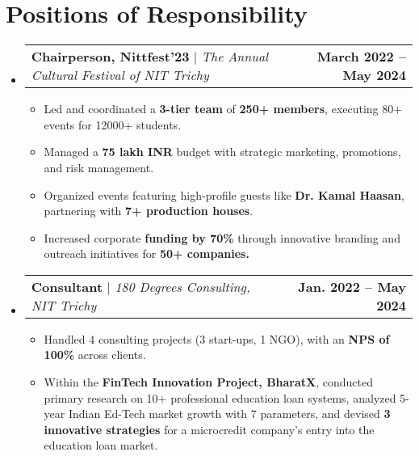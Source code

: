 \documentclass[letterpaper,11pt]{article}
\makeatletter
\newcommand{\resumeProjectHeading}[2]{
    \item
    \begin{tabular*}{0.97\textwidth}{l@{\extracolsep{\fill}}r}
      \small#1 & \textbf{{\small#2}} \\
    \end{tabular*}\vspace{-7pt}
}
\newcommand{\resumeItem}[1]{
  \item\small{
    {#1 \vspace{-2pt}}
  }
}
\newcommand{\resumeSubHeadingListStart}{\begin{itemize}[leftmargin=0.15in, label={}]}
\newcommand{\resumeSubHeadingListEnd}{\end{itemize}}
\newcommand{\resumeItemListStart}{\begin{itemize}}
\newcommand{\resumeItemListEnd}{\end{itemize}\vspace{-5pt}}
\makeatother
\begin{document}
\section{Positions of Responsibility}
    \resumeSubHeadingListStart
      \resumeProjectHeading
          {\textbf{Chairperson, Nittfest’23} $|$ \emph{The Annual Cultural Festival of NIT Trichy}}{March 2022 -- May 2024}
          \resumeItemListStart
            \resumeItem{Led and coordinated a \textbf{3-tier team} of \textbf{250+ members}, executing 80+ events for 12000+ students.}
            \resumeItem{Managed a \textbf{75 lakh INR }budget with strategic marketing, promotions, and risk management.}
            \resumeItem{Organized events featuring high-profile guests like \textbf{Dr. Kamal Haasan}, partnering with \textbf{7+ production houses}.}
            \resumeItem{Increased corporate \textbf{funding by 70\%} through innovative branding and outreach initiatives for \textbf{50+ companies.}}
          \resumeItemListEnd

      \resumeProjectHeading
          {\textbf{Consultant} $|$ \emph{180 Degrees Consulting, NIT Trichy}}{Jan. 2022 -- May 2024}
          \resumeItemListStart
            \resumeItem{Handled 4 consulting projects (3 start-ups, 1 NGO), with an \textbf{NPS of 100\%} across clients.}
            \resumeItem{Within the \textbf{FinTech Innovation Project, BharatX}, conducted primary research on 10+ professional education loan systems, analyzed 5-year Indian Ed-Tech market growth with 7 parameters, and devised \textbf{3 innovative strategies} for a microcredit company's entry into the education loan market.}
          \resumeItemListEnd
    \resumeSubHeadingListEnd




\end{document}
